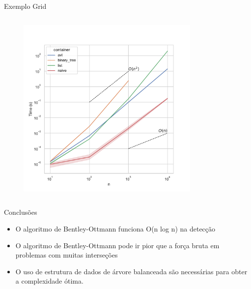 \documentclass[aspectratio=169,usenames,dvipsnames]{beamer}
\begin{document}
\begin{frame}{Exemplo Grid}
\begin{columns}
\begin{column}{0.65\textwidth}
\begin{figure}
        \includegraphics[width=0.8\textwidth]{figs/tempos/plot_grid_time.pdf}
      \end{figure}
    \end{column}
  \end{columns}
\end{frame}

\begin{frame}{Conclusões}

  \begin{itemize}
    \item O algoritmo de Bentley-Ottmann funciona O(n log n) na detecção
    \item O algoritmo de Bentley-Ottmann pode ir pior que a força bruta em problemas com muitas interseções
    \item O uso de estrutura de dados de árvore balanceada são necessárias para obter a complexidade ótima.
  \end{itemize}
  
\end{frame}
\end{document}

